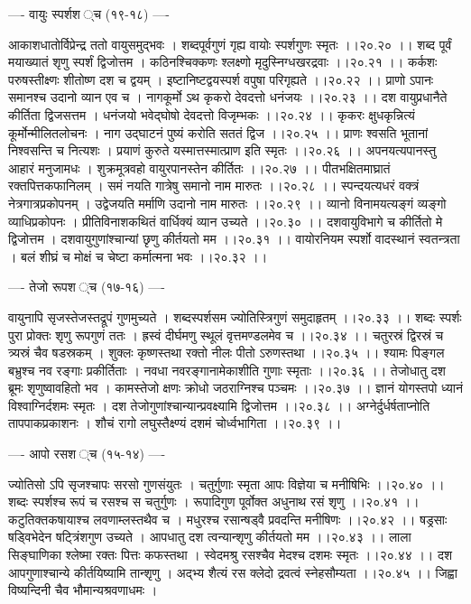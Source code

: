 \documentclass[11pt]{book}
\begin{document}
\begin{landscape}
---- वायुः स्पर्शश{ }्च (१९-१८) ----

आकाशधातोर्विप्रेन्द्र ततो वायुसमुद्भवः ।
शब्दपूर्वगुणं गृह्य वायोः स्पर्शगुणः स्मृतः ।।२०.२० ।।
शब्द पूर्वं मयाख्यातं शृणु स्पर्शं द्विजोत्तम ।
कठिनश्चिक्कणः श्लक्ष्णो मृदुस्निग्धखरद्रवाः ।।२०.२१ ।।
कर्कशः परुषस्तीक्ष्णः शीतोष्ण दश च द्वयम् ।
इष्टानिष्टद्वयस्पर्श वपुषा परिगृह्यते ।।२०.२२ ।।
प्राणो ऽपानः समानश्च उदानो व्यान एव च ।
नागकूर्मो ऽथ कृकरो देवदत्तो धनंजयः ।।२०.२३ ।।
दश वायुप्रधानैते कीर्तिता द्विजसत्तम ।
धनंजयो भवेद्घोषो देवदत्तो विजृम्भकः ।।२०.२४ ।।
कृकरः क्षुधकृन्नित्यं कूर्मोन्मीलितलोचनः ।
नाग उद्घाटनं पुष्यं करोति सततं द्विज ।।२०.२५ ।।
प्राणः श्वसति भूतानां निश्वसन्ति च नित्यशः ।
प्रयाणं कुरुते यस्मात्तस्मात्प्राण इति स्मृतः ।।२०.२६ ।।
अपनयत्यपानस्तु आहारं मनुजामधः ।
शुक्रमूत्रवहो वायुरपानस्तेन कीर्तितः ।।२०.२७ ।।
पीतभक्षितमाघ्रातं रक्तपित्तकफानिलम् ।
समं नयति गात्रेषु समानो नाम मारुतः ।।२०.२८ ।।
स्पन्दयत्यधरं वक्त्रं नेत्रगात्रप्रकोपनम् ।
उद्वेजयति मर्माणि उदानो नाम मारुतः ।।२०.२९ ।।
व्यानो विनामयत्यङ्गं व्यङ्गो व्याधिप्रकोपनः ।
प्रीतिविनाशकथितं वार्धिक्यं व्यान उच्यते ।।२०.३० ।।
दशवायुविभागे च कीर्तितो मे द्विजोत्तम ।
दशवायुगुणांश्चान्यां छृणु कीर्तयतो मम ।।२०.३१ ।।
वायोरनियम स्पर्शो वादस्थानं स्वतन्त्रता ।
बलं शीघ्रं च मोक्षं च चेष्टा कर्मात्मना भवः ।।२०.३२ ।।

---- तेजो रूपश{ }्च (१७-१६) ----

वायुनापि सृजस्तेजस्तद्रूपं गुणमुच्यते ।
शब्दस्पर्शसम ज्योतिस्त्रिगुणं समुदाहृतम् ।।२०.३३ ।।
शब्दः स्पर्शः पुरा प्रोक्तः शृणु रूपगुणं ततः ।
ह्रस्वं दीर्घमणु स्थूलं वृत्तमण्डलमेव च ।।२०.३४ ।।
चतुरस्रं द्विरस्रं च त्र्यस्रं चैव षडस्रकम् ।
शुक्लः कृष्णस्तथा रक्तो नीलः पीतो ऽरुणस्तथा ।।२०.३५ ।।
श्यामः पिङ्गल बभ्रुश्च नव रङ्गाः प्रकीर्तिताः ।
नवधा नवरङ्गानामेकाशीति गुणाः स्मृताः ।।२०.३६ ।।
तेजोधातु दश ब्रूमः शृणुष्वावहितो भव ।
कामस्तेजो क्षणः क्रोधो जठराग्निश्च पञ्चमः ।।२०.३७ ।।
ज्ञानं योगस्तपो ध्यानं विश्वाग्निर्दशमः स्मृतः ।
दश तेजोगुणांश्चान्यान्प्रवक्ष्यामि द्विजोत्तम ।।२०.३८ ।।
अग्नेर्दुर्धर्षताप्नोति तापपाकप्रकाशनः ।
शौचं रागो लघुस्तैक्ष्ण्यं दशमं चोर्ध्वभागिता ।।२०.३९ ।।

---- आपो रसश{ }्च (१५-१४) ----

ज्योतिसो ऽपि सृजश्चापः सरसो गुणसंयुतः ।
चतुर्गुणाः स्मृता आपः विज्ञेया च मनीषिभिः ।।२०.४० ।।
शब्दः स्पर्शश्च रूपं च रसश्च स चतुर्गुणः ।
रूपादिगुण पूर्वोक्त अधुनाथ रसं शृणु ।।२०.४१ ।।
कटुतिक्तकषायाश्च लवणाम्लस्तथैव च ।
मधुरश्च रसान्षड्वै प्रवदन्ति मनीषिणः ।।२०.४२ ।।
षड्रसाः षड्विभेदेन षट्त्रिंशगुण उच्यते ।
आपधातु दश त्वन्यान्शृणु कीर्तयतो मम ।।२०.४३ ।।
लाला सिङ्घाणिका श्लेष्मा रक्तः पित्तः कफस्तथा ।
स्वेदमश्रु रसश्चैव मेदश्च दशमः स्मृतः ।।२०.४४ ।।
दश आपगुणाश्चान्ये कीर्तयिष्यामि तान्शृणु ।
अद्भ्य शैत्यं रस क्लेदो द्रवत्वं स्नेहसौम्यता ।।२०.४५ ।।
जिह्वा विष्यन्दिनी चैव भौमान्यश्रवणाधमः ।


\end{landscape}
\end{document}
